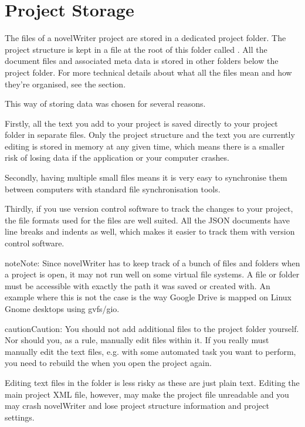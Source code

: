 \documentclass[a4paper,11pt,english]{sphinxmanual}
\begin{document}
\section{Project Storage}
\label{\detokenize{usage_breakdown:project-storage}}\label{\detokenize{usage_breakdown:a-breakdown-storage}}
\sphinxAtStartPar
The files of a novelWriter project are stored in a dedicated project folder. The project structure
is kept in a file at the root of this folder called . All the document files and
associated meta data is stored in other folders below the project folder. For more technical
details about what all the files mean and how they’re organised, see the {\hyperref[\detokenize{tech_storage:a-storage}]{}} section.

\sphinxAtStartPar
This way of storing data was chosen for several reasons.

\sphinxAtStartPar
Firstly, all the text you add to your project is saved directly to your project folder in separate
files. Only the project structure and the text you are currently editing is stored in memory at any
given time, which means there is a smaller risk of losing data if the application or your computer
crashes.

\sphinxAtStartPar
Secondly, having multiple small files means it is very easy to synchronise them between computers
with standard file synchronisation tools.

\sphinxAtStartPar
Thirdly, if you use version control software to track the changes to your project, the file formats
used for the files are well suited. All the JSON documents have line breaks and indents as well,
which makes it easier to track them with version control software.

\begin{sphinxadmonition}{note}{Note:}
\sphinxAtStartPar
Since novelWriter has to keep track of a bunch of files and folders when a project is open, it
may not run well on some virtual file systems. A file or folder must be accessible with exactly
the path it was saved or created with. An example where this is not the case is the way Google
Drive is mapped on Linux Gnome desktops using gvfs/gio.
\end{sphinxadmonition}

\begin{sphinxadmonition}{caution}{Caution:}
\sphinxAtStartPar
You should not add additional files to the project folder yourself. Nor should you, as a rule,
manually edit files within it. If you really must manually edit the text files, e.g. with some
automated task you want to perform, you need to rebuild the {\hyperref[\detokenize{int_glossary:term-Project-Index}]{}} when you open
the project again.

\sphinxAtStartPar
Editing text files in the  folder is less risky as these are just plain text. Editing
the main project XML file, however, may make the project file unreadable and you may crash
novelWriter and lose project structure information and project settings.
\end{sphinxadmonition}
\end{document}
